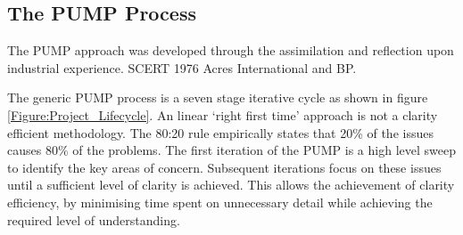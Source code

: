 \subsection{The PUMP Process}

The PUMP approach was developed through the assimilation and reflection upon industrial experience.
SCERT 1976 Acres International and BP.

The generic PUMP process is a seven stage iterative cycle as shown in figure \ref{Figure:Project_Lifecycle}. 
An linear `right first time' approach is not a clarity efficient methodology.
The 80:20 rule empirically states that 20\% of the issues causes 80\% of the problems. 
The first iteration of the PUMP is a high level sweep to identify the key areas of concern.
Subsequent iterations focus on these issues until a sufficient level of clarity is achieved.
This allows the achievement of clarity efficiency, by minimising time spent on unnecessary detail while achieving the required level of understanding.

